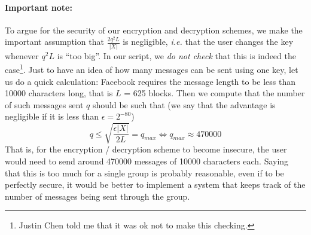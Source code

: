 \documentclass[10pt,twocolumn]{article}
\begin{document}
\begin{itemize}
\paragraph{Important note:} To argue for the security of our encryption and decryption schemes, we make the important assumption that $\frac{2q^2L}{|X|}$ is negligible, \emph{i.e.} that the user changes the key whenever $q^2L$ is ``too big''. In our script, we \emph{do not check} that this is indeed the case\footnote{Justin Chen told me that it was ok not to make this checking.}. Just to have an idea of how many messages can be sent using one key, let us do a quick calculation: Facebook requires the message length to be less than 10000 characters long, that is $L$ = 625 blocks. Then we compute that the number of such messages sent $q$ should be such that (we say that the advantage is negligible if it is less than $\epsilon = 2^{-80}$)
\begin{equation*}
q \leq \sqrt{\frac{\epsilon|X|}{2L}}  = q_{max} \Leftrightarrow q_{max} \approx 470000
\end{equation*}
That is, for the encryption / decryption scheme to become insecure, the user would need to send around 470000 messages of 10000 characters each. Saying that this is too much for a single group is probably reasonable, even if to be perfectly secure, it would be better to implement a system that keeps track of the number of messages being sent through the group.
\end{itemize}



% 
\end{document}
